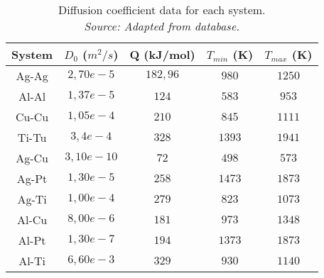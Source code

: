 \begin{table}[h]
    \centering
    \captionsetup{justification=centering}
    \begin{tabular}{ccccc}
        System & $D_0$ ($m^2/s$) & Q (kJ/mol) & $T_{min}$ (K) & $T_{max}$ (K) \\ \hline \hline
        Ag-Ag & $2,70e-5$ & $182,96$ & $980$ & $1250$\\
        Al-Al & $1,37e-5$ & $124$ & $583$ & $953$ \\
        Cu-Cu & $1,05e-4$ & $210$ & $845$ & $1111$\\
        Ti-Tu & $3,4e-4$ & $328$ & $1393$ & $1941$ \\
        Ag-Cu & $3,10e-10$ & $72$ & $498$ & $573$\\
        Ag-Pt & $1,30e-5$ & $258$ & $1473$ & $1873$\\
        Ag-Ti & $1,00e-4$ & $279$ & $823$ & $1073$ \\
        Al-Cu & $8,00e-6$ & $181$ & $973$ & $1348$ \\
        Al-Pt & $1,30e-7$ & $194$ & $1373$ & $1873$\\
        Al-Ti & $6,60e-3$ & $329$ & $930$ & $1140$
    \end{tabular}
    \caption{Diffusion coefficient data for each system. \\
    \textit{Source: Adapted from \citep{kakusan} database.}}
    \label{tab:tabla2}
\end{table}